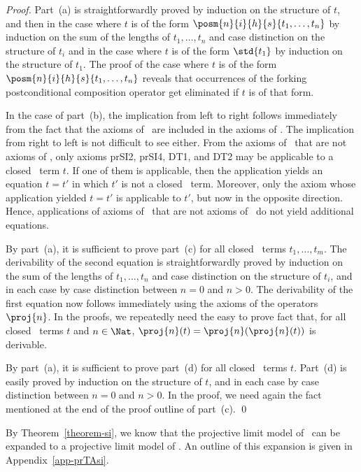 \documentclass{llncs}
\begin{document}
\begin{proof}
Part~(a) is straightforwardly proved by induction on the structure of 
$t$, and then in the case where $t$ is of the form 
$\posm{n}{i}{h}{s}{t_1,\ldots,t_n}$ by induction on the sum of the 
lengths of $t_1,\ldots,t_n$ and case distinction on the structure of 
$t_i$ and in the case where $t$ is of the form $\std{t_1}$ by induction 
on the structure of $t_1$.
The proof of the case where $t$ is of the form
$\posm{n}{i}{h}{s}{t_1,\ldots,t_n}$ reveals that occurrences of the 
forking postconditional composition operator get eliminated if $t$ is of
that form.

In the case of part~(b), the implication from left to right follows 
immediately from the fact that the axioms of \prBTAnt\ are included in 
the axioms of \prTA.
The implication from right to left is not difficult to see either. 
From the axioms of \prTA\ that are not axioms of \prBTAnt, only axioms 
prSI2, prSI4, DT1, and DT2 may be applicable to a closed \prBTAnt\ term 
$t$.
If one of them is applicable, then the application yields an equation 
$t = t'$ in which $t'$ is not a closed \prBTAnt\ term.
Moreover, only the axiom whose application yielded $t = t'$ is 
applicable to $t'$, but now in the opposite direction.
Hence, applications of axioms of \prTA\ that are not axioms of \prBTAnt\
do not yield additional equations.

By part~(a), it is sufficient to prove part~(c) for all closed \prBTAnt\ 
terms $t_1,\ldots,t_m$.
The derivability of the second equation is straightforwardly proved by 
induction on the sum of the lengths of $t_1,\ldots,t_n$ and case 
distinction on the structure of $t_i$, and in each case by case 
distinction between $n = 0$ and $n > 0$.
The derivability of the first equation now follows immediately using the 
axioms of the operators $\proj{n}$.
In the proofs, we repeatedly need the easy to prove fact that, for all 
closed \prBTAnt\ terms $t$ and $n \in \Nat$, 
$\proj{n}(t) = \proj{n}(\proj{n}(t))$ is derivable.

By part~(a), it is sufficient to prove part~(d) for all closed \prBTAnt\ 
terms $t$.
Part~(d) is easily proved by induction on the structure of $t$, and in 
each case by case distinction between $n = 0$ and $n > 0$.
In the proof, we need again the fact mentioned at the end of the proof
outline of part~(c).
\qed
\end{proof}

By Theorem~\ref{theorem-si}, we know that the projective limit model 
of \prBTAnt\ can be expanded to a projective limit model of \prTA.
An outline of this expansion is given in Appendix~\ref{app-prTAsi}.
\end{document}
